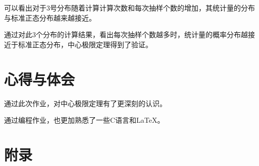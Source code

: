 \documentclass[a4paper,11pt]{article}
\begin{document}
\newpage
 可以看出对于3号分布随着计算计算次数和每次抽样个数的增加，其统计量的分布与标准正态分布越来越接近。
 
 通过对此3个分布的计算结果，看出每次抽样个数越多时，统计量的概率分布越接近于标准正态分布，中心极限定理得到了验证。
 

\section{心得与体会}
通过此次作业，对中心极限定理有了更深刻的认识。

通过编程作业，也更加熟悉了一些C语言和\LaTeX 。

\newpage
\section{附录}
\end{document}
